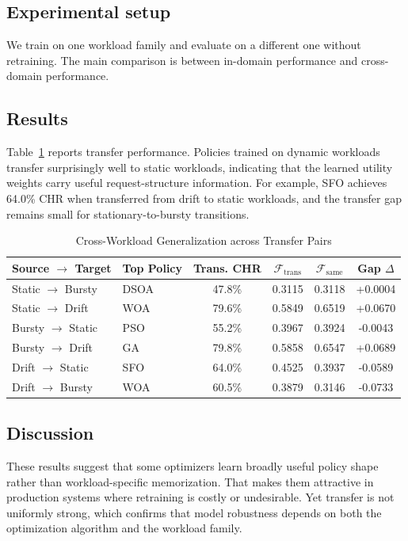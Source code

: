 \documentclass[10pt,journal,compsoc]{IEEEtran}
\begin{document}
\subsection{Experimental setup}
We train on one workload family and evaluate on a different one without retraining. The main comparison is between in-domain performance and cross-domain performance.

\subsection{Results}
Table~\ref{tab:rq6} reports transfer performance. Policies trained on dynamic workloads transfer surprisingly well to static workloads, indicating that the learned utility weights carry useful request-structure information. For example, SFO achieves 64.0\% CHR when transferred from drift to static workloads, and the transfer gap remains small for stationary-to-bursty transitions.

\begin{table}[htbp]
\centering
\caption{Cross-Workload Generalization across Transfer Pairs}
\label{tab:rq6}
\begin{tabular}{llcccc}
\toprule
\textbf{Source $\to$ Target} & \textbf{Top Policy} & \textbf{Trans. CHR} & $\mathcal{F}_{\text{trans}}$ & $\mathcal{F}_{\text{same}}$ & \textbf{Gap $\Delta$} \\
\midrule
Static $\to$ Bursty & DSOA & 47.8\% & 0.3115 & 0.3118 & +0.0004 \\
Static $\to$ Drift  & WOA  & 79.6\% & 0.5849 & 0.6519 & +0.0670 \\
Bursty $\to$ Static & PSO  & 55.2\% & 0.3967 & 0.3924 & -0.0043 \\
Bursty $\to$ Drift  & GA   & 79.8\% & 0.5858 & 0.6547 & +0.0689 \\
Drift $\to$ Static  & SFO  & 64.0\% & 0.4525 & 0.3937 & -0.0589 \\
Drift $\to$ Bursty  & WOA  & 60.5\% & 0.3879 & 0.3146 & -0.0733 \\
\bottomrule
\end{tabular}
\end{table}

\subsection{Discussion}
These results suggest that some optimizers learn broadly useful policy shape rather than workload-specific memorization. That makes them attractive in production systems where retraining is costly or undesirable. Yet transfer is not uniformly strong, which confirms that model robustness depends on both the optimization algorithm and the workload family.
\end{document}
